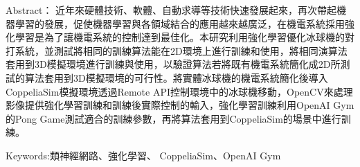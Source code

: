 \begin{flushleft}
\timesbi Abstract：\sectionef 
近年來硬體技術、軟體、自動求導等技術快速發展起來，再次帶起機器學習的發展，促使機器學習與各領域結合的應用越來越廣泛，在機電系統採用強化學習是為了讓機電系統的控制達到最佳化。本研究利用強化學習優化冰球機的對打系統，並測試將相同的訓練算法能在2D環境上進行訓練和使用，將相同演算法套用到3D模擬環境進行訓練與使用，以驗證算法若將既有機電系統簡化成2D所測試的算法套用到3D模擬環境的可行性。將實體冰球機的機電系統簡化後導入CoppeliaSim模擬環境透過Remote API控制環境中的冰球機移動，OpenCV來處理影像提供強化學習訓練和訓練後實際控制的輸入，強化學習訓練利用OpenAI Gym的Pong Game測試適合的訓練參數，再將算法套用到CoppeliaSim的場景中進行訓練。\\%
\end{flushleft}
\begin{flushleft}
\timesbi Keywords:\sectionef 類神經網路、強化學習、 CoppeliaSim、OpenAI Gym
\end{flushleft}
\vspace{1pt}